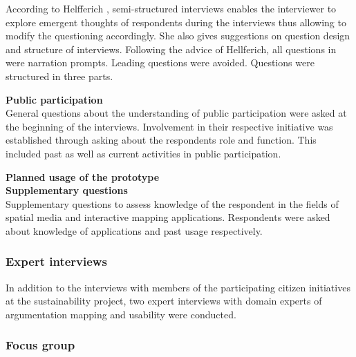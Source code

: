 According to Helfferich \cite{helfferich2005}, semi-structured interviews enables the interviewer to explore emergent thoughts of respondents during the interviews thus allowing to modify the questioning accordingly.  She also gives suggestions on question design and structure of interviews. Following the advice of Hellferich, all questions in were narration prompts. Leading questions were avoided. Questions were structured in three parts.

\textbf{Public participation}\\
General questions about the understanding of public participation were asked at the beginning of the interviews. Involvement in their respective initiative was established through asking about the respondents role and function. This included past as well as current activities in public participation.  

\textbf{Planned usage of the prototype}\\


\textbf{Supplementary questions}\\
Supplementary questions to assess knowledge of the respondent in the fields of spatial media and interactive mapping applications. Respondents were asked about knowledge of applications and past usage respectively.


\subsubsection{Expert interviews}

In addition to the interviews with members of the participating citizen initiatives at the sustainability project, two expert interviews with domain experts of argumentation mapping and usability were conducted.


\subsubsection{Focus group}

